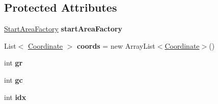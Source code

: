\subsection*{Protected Attributes}
\begin{DoxyCompactItemize}
\item 
\hypertarget{classdev_1_1boxy_1_1fortyfive_1_1core_1_1startarea_1_1_start_area_a6d062a6f3bcd5d30fe9a232b875acc34}{
\hyperlink{classdev_1_1boxy_1_1fortyfive_1_1core_1_1startarea_1_1_start_area_factory}{StartAreaFactory} {\bfseries startAreaFactory}}
\label{d0/daf/classdev_1_1boxy_1_1fortyfive_1_1core_1_1startarea_1_1_start_area_a6d062a6f3bcd5d30fe9a232b875acc34}

\item 
\hypertarget{classdev_1_1boxy_1_1fortyfive_1_1core_1_1startarea_1_1_start_area_aa3a192d12511a7d547042d2e839f6ccb}{
List$<$ \hyperlink{classdev_1_1boxy_1_1fortyfive_1_1core_1_1startarea_1_1_coordinate}{Coordinate} $>$ {\bfseries coords} = new ArrayList$<$\hyperlink{classdev_1_1boxy_1_1fortyfive_1_1core_1_1startarea_1_1_coordinate}{Coordinate}$>$()}
\label{d0/daf/classdev_1_1boxy_1_1fortyfive_1_1core_1_1startarea_1_1_start_area_aa3a192d12511a7d547042d2e839f6ccb}

\item 
\hypertarget{classdev_1_1boxy_1_1fortyfive_1_1core_1_1startarea_1_1_start_area_a247540d426a5eb7c9ed80fd6d762eb79}{
int {\bfseries gr}}
\label{d0/daf/classdev_1_1boxy_1_1fortyfive_1_1core_1_1startarea_1_1_start_area_a247540d426a5eb7c9ed80fd6d762eb79}

\item 
\hypertarget{classdev_1_1boxy_1_1fortyfive_1_1core_1_1startarea_1_1_start_area_ae83045f818b60e5f8020a1baad734216}{
int {\bfseries gc}}
\label{d0/daf/classdev_1_1boxy_1_1fortyfive_1_1core_1_1startarea_1_1_start_area_ae83045f818b60e5f8020a1baad734216}

\item 
\hypertarget{classdev_1_1boxy_1_1fortyfive_1_1core_1_1startarea_1_1_start_area_ad76308e0866edce29aacce167262ac90}{
int {\bfseries idx}}
\label{d0/daf/classdev_1_1boxy_1_1fortyfive_1_1core_1_1startarea_1_1_start_area_ad76308e0866edce29aacce167262ac90}

\end{DoxyCompactItemize}


